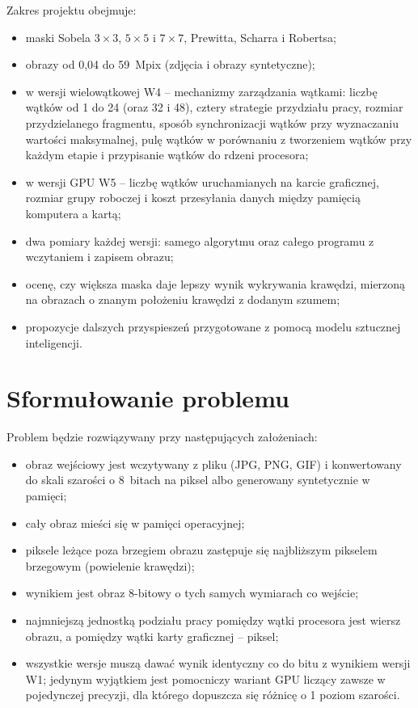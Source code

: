 \documentclass[12pt,a4paper]{article}
\begin{document}
Zakres projektu obejmuje:
\begin{itemize}
	\item maski Sobela $3\times3$, $5\times5$ i $7\times7$, Prewitta, Scharra i Robertsa;
	\item obrazy od 0,04 do 59~Mpix (zdjęcia i obrazy syntetyczne);
	\item w wersji wielowątkowej W4 -- mechanizmy zarządzania wątkami: liczbę wątków od 1 do 24 (oraz 32 i 48), cztery strategie przydziału pracy, rozmiar przydzielanego fragmentu, sposób synchronizacji wątków przy wyznaczaniu wartości maksymalnej, pulę wątków w porównaniu z tworzeniem wątków przy każdym etapie i przypisanie wątków do rdzeni procesora;
	\item w wersji GPU W5 -- liczbę wątków uruchamianych na karcie graficznej, rozmiar grupy roboczej i koszt przesyłania danych między pamięcią komputera a kartą;
	\item dwa pomiary każdej wersji: samego algorytmu oraz całego programu z wczytaniem i zapisem obrazu;
	\item ocenę, czy większa maska daje lepszy wynik wykrywania krawędzi, mierzoną na obrazach o znanym położeniu krawędzi z dodanym szumem;
	\item propozycje dalszych przyspieszeń przygotowane z pomocą modelu sztucznej inteligencji.
\end{itemize}

\section{Sformułowanie problemu}

Problem będzie rozwiązywany przy następujących założeniach:
\begin{itemize}
	\item obraz wejściowy jest wczytywany z pliku (JPG, PNG, GIF) i konwertowany do skali szarości o 8~bitach na piksel albo generowany syntetycznie w pamięci;
	\item cały obraz mieści się w pamięci operacyjnej;
	\item piksele leżące poza brzegiem obrazu zastępuje się najbliższym pikselem brzegowym (powielenie krawędzi);
	\item wynikiem jest obraz 8-bitowy o tych samych wymiarach co wejście;
	\item najmniejszą jednostką podziału pracy pomiędzy wątki procesora jest wiersz obrazu, a pomiędzy wątki karty graficznej -- piksel;
	\item wszystkie wersje muszą dawać wynik identyczny co do bitu z wynikiem wersji W1; jedynym wyjątkiem jest pomocniczy wariant GPU liczący zawsze w pojedynczej precyzji, dla którego dopuszcza się różnicę o 1 poziom szarości.
\end{itemize}
\end{document}
